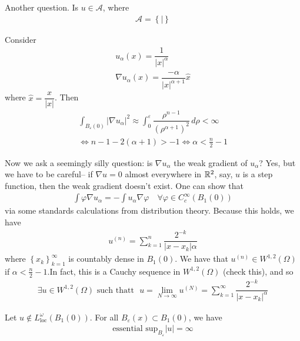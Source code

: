 \documentclass{memoir}
\begin{document}
Another question. Is \(u \in \mathcal{A}\), where 
\begin{align*}
	\mathcal{A} = \left\{ \mid  \right\} 
\end{align*}

\begin{exmp}
	Consider
	\begin{align*}
		u_\alpha (x) = \dfrac{1}{\left| x \right|^{\alpha }}\\
		\nabla u_\alpha (x) = \dfrac{-\alpha }{\left| x \right|^{\alpha +1}} \hat{x}
	\end{align*}
	where \(\hat{x} = \dfrac{x}{\left| x \right| }\). Then
	\begin{align*}
		\int_{B_\varepsilon(0)} \left| \nabla u_\alpha  \right|^2 \approx \int_{0}^{\varepsilon} \dfrac{\rho^{n-1}}{\left( \rho^{\alpha +1} \right)^2} \,d \rho < \infty \\
		\iff n-1 -2(\alpha +1) > -1 \iff\alpha < \frac{n}{2}-1
	\end{align*}
\end{exmp}

	Now we ask a seemingly silly question: is \(\nabla u_{\alpha }\) the weak gradient of \(u_\alpha \)? Yes, but we have to be careful-- if \(\nabla u = 0\) almost everywhere in \(\mathbb{R}^2\), say, \(u\) is a step function, then the weak gradient doesn't exist. One can show that
	\begin{align*}
		\int \varphi \nabla u_{\alpha } = - \int u_\alpha \nabla \varphi \quad \forall \varphi \in C^{\infty}_c(B_1(0))	
	\end{align*}
via some standards calculations from distribution theory. Because this holds, we have
\begin{align*}
	u^{(n)} = \sum_{k=1}^{n} \dfrac{2^{-k}}{\left| x-x_k \right|\alpha }
\end{align*}
where \(\left\{ x_k\right\}_{k=1}^{\infty} \) is countably dense in \(B_1(0)\). We have that \(u^{(n)} \in W^{1,2}(\Omega )\) if \(\alpha < \frac{n}{2}-1\).In fact, this is a Cauchy sequence in \(W^{1,2}(\Omega )\) (check this), and so
\begin{align*}
	\exists u \in W^{1,2}(\Omega ) \text{ such that{t} } u = \lim_{N \to \infty} u^{(N)}= \sum_{k=1}^{\infty} \dfrac{2^{-k}}{\left| x-x_k \right|^{\alpha }}
\end{align*}

\begin{exmp}
	Let \(u \not\in L^{\omega }_{\textrm{loc}}(B_{1}(0))\). For all \(B_\varepsilon(x) \subset B_1(0)\), we have
	\begin{align*}
		\textrm{essential sup}_{B_\varepsilon} \left| u \right|  = \infty
	\end{align*}
\end{exmp}
\end{document}

